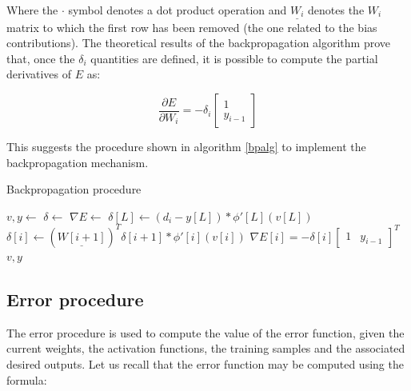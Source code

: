 \documentclass[letterpaper,headings=standardclasses]{scrartcl}
\begin{document}
Where the $\cdot$ symbol denotes a dot product operation and $\underline{W_i}$ denotes the $W_i$ matrix to which the first row has been removed (the one related to the bias contributions). The theoretical results of the backpropagation algorithm prove that, once the $\delta_i$ quantities are defined, it is possible to compute the partial derivatives of $E$ as:

$$ \frac{\partial E}{\partial W_i} = - \delta_i \left[ \begin{matrix} 1 \\ y_{i - 1} \end{matrix} \right] $$

This suggests the procedure shown in algorithm \ref{bpalg} to implement the backpropagation mechanism.

\begin{algorithm}[h]
    \caption{Backpropagation procedure}
    \label{bpalg}
    \begin{algorithmic}
    
        \State {}
        \State $v, y \gets $ 
        \State $\delta \gets $ 
        \State $\nabla E \gets $ 
        \State {}
        \State $\delta[L] \gets (d_i - y[L]) * \phi'[L](v[L])$
            \State $\delta[i] \gets \left( \underline{W[i + 1]} \right)^T \delta[i + 1] * \phi'[i](v[i])$
        \EndFor
        \State {}
            \State $\nabla E[i] = -\delta[i] \left[ \begin{matrix} 1 & y_{i - 1} \end{matrix} \right]^T$
        \EndFor
        \State \Return $v, y$
    \EndFunction
    
    \end{algorithmic}
\end{algorithm}

\subsection{Error procedure}

The error procedure is used to compute the value of the error function, given the current weights, the activation functions, the training samples and the associated desired outputs. Let us recall that the error function may be computed using the formula:
\end{document}
